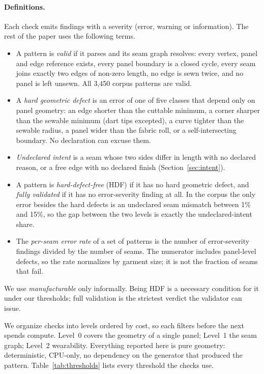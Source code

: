 \documentclass[10pt,twocolumn]{article}
\begin{document}
\paragraph{Definitions.} Each check emits findings with a severity (error,
warning or information). The rest of the paper uses the following terms.
\begin{itemize}\itemsep1pt
  \item A pattern is \emph{valid} if it parses and its seam graph resolves:
  every vertex, panel and edge reference exists, every panel boundary is a
  closed cycle, every seam joins exactly two edges of non-zero length, no edge
  is sewn twice, and no panel is left unsewn.
  All 3{,}450 corpus patterns are valid.
  \item A \emph{hard geometric defect} is an error of one of five classes that
  depend only on panel geometry: an edge shorter than the cuttable minimum, a
  corner sharper than the sewable minimum (dart tips excepted), a curve tighter
  than the sewable radius, a panel wider than the fabric roll, or a
  self-intersecting boundary. No declaration can excuse them.
  \item \emph{Undeclared intent} is a seam whose two sides differ in length
  with no declared reason, or a free edge with no declared finish
  (Section~\ref{sec:intent}).
  \item A pattern is \emph{hard-defect-free} (HDF) if it has no hard geometric
  defect, and \emph{fully validated} if it has no error-severity finding at
  all. In the corpus the only error besides the hard defects is an undeclared
  seam mismatch between 1\% and 15\%, so the gap between the two levels is
  exactly the undeclared-intent share.
  \item The \emph{per-seam error rate} of a set of patterns is the number of
  error-severity findings divided by the number of seams. The numerator
  includes panel-level defects, so the rate normalizes by garment size; it is
  not the fraction of seams that fail.
\end{itemize}
We use \emph{manufacturable} only informally. Being HDF is a necessary
condition for it under our thresholds; full validation is the strictest
verdict the validator can issue.

We organize checks into levels ordered by cost, so each filters before the next
spends compute. Level~0 covers the geometry of a single panel; Level~1 the seam
graph; Level~2 wearability. Everything reported here is pure geometry:
deterministic, CPU-only, no dependency on the generator that produced the
pattern. Table~\ref{tab:thresholds} lists every threshold the checks use.
\end{document}
